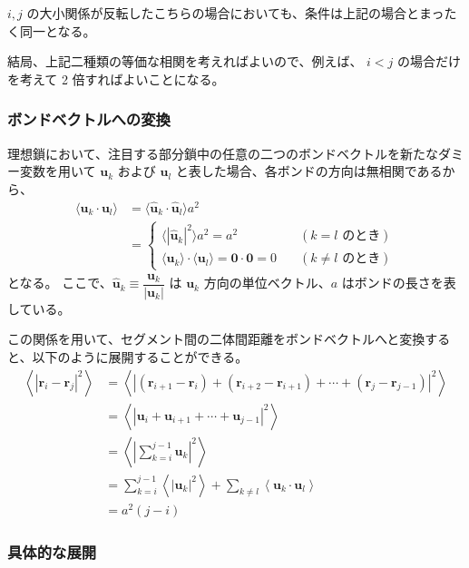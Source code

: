 \documentclass[a4paper,11pt]{ltjsarticle}
\begin{document}
\begin{appendix}
\begin{itemize}
$i,j$ の大小関係が反転したこちらの場合においても、条件は上記の場合とまったく同一となる。
\end{itemize}

結局、上記二種類の等価な相関を考えればよいので、例えば、 $i < j$ の場合だけを考えて 2 倍すればよいことになる。

\subsubsection{ボンドベクトルへの変換}

理想鎖において、注目する部分鎖中の任意の二つのボンドベクトルを新たなダミー変数を用いて $\bm{u}_k$ および $\bm{u}_l$ と表した場合、各ボンドの方向は無相関であるから、
\begin{align*}
\langle \bm{u}_k \cdot \bm{u}_l \rangle 
	&= \langle \bm{\hat{u}}_k \cdot \bm{\hat{u}}_l \rangle a^2 \\
	&=
\begin{cases}
\langle |\bm{\hat{u}}_k |^2 \rangle a^2 = a^2	&\quad (\text{$k = l$ のとき}) \\
\langle \bm{u}_k \rangle \cdot \langle \bm{u}_l \rangle = \bm{0}\cdot\bm{0} = 0	&\quad(\text{$k \neq l$ のとき})
\end{cases}
\end{align*}
となる。
ここで、$\bm{\hat{u}}_k \equiv \dfrac{\bm{u}_k}{|\bm{u}_k|}$ は $\bm{u}_k$ 方向の単位ベクトル、$a$ はボンドの長さを表している。

この関係を用いて、セグメント間の二体間距離をボンドベクトルへと変換すると、以下のように展開することができる。
\begin{align*}
\left \langle \left | \bm{r}_i - \bm{r}_j \right |^2 \right \rangle
	&= \left \langle \left | (\bm{r}_{i+1} - \bm{r}_i) + (\bm{r}_{i+2} - \bm{r}_{i+1}) + \cdots + (\bm{r}_j - \bm{r}_{j-1}) \right |^2 \right \rangle \\
	&= \left \langle \left | \bm{u}_i + \bm{u}_{i+1} + \cdots + \bm{u}_{j-1} \right |^2 \right \rangle \\
	&= \left \langle \left| \sum_{k=i}^{j-1} \bm{u}_{k} \right|^2 \right\rangle \\
	&= \sum_{k=i}^{j-1} \left \langle \left| \bm{u}_{k} \right|^2 \right\rangle + \sum_{k \neq l} \left \langle \bm{u}_{k} \cdot \bm{u}_{l} \right\rangle \\
	&= a^2(j-i)
\end{align*}


\subsubsection{具体的な展開}



\end{appendix}
\end{document}
